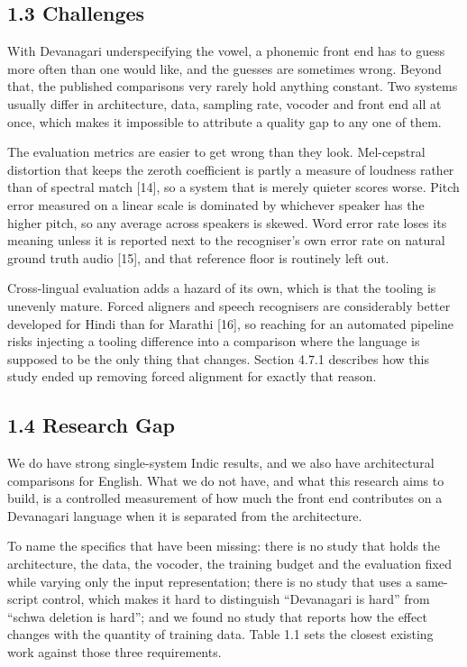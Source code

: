 \documentclass[12pt,a4paper]{article}
\begin{document}
\subsection*{1.3  Challenges}
With Devanagari underspecifying the vowel, a phonemic front end has to guess more often than one would like, and the guesses are sometimes wrong. Beyond that, the published comparisons very rarely hold anything constant. Two systems usually differ in architecture, data, sampling rate, vocoder and front end all at once, which makes it impossible to attribute a quality gap to any one of them.

The evaluation metrics are easier to get wrong than they look. Mel-cepstral distortion that keeps the zeroth coefficient is partly a measure of loudness rather than of spectral match [14], so a system that is merely quieter scores worse. Pitch error measured on a linear scale is dominated by whichever speaker has the higher pitch, so any average across speakers is skewed. Word error rate loses its meaning unless it is reported next to the recogniser's own error rate on natural ground truth audio [15], and that reference floor is routinely left out.

Cross-lingual evaluation adds a hazard of its own, which is that the tooling is unevenly mature. Forced aligners and speech recognisers are considerably better developed for Hindi than for Marathi [16], so reaching for an automated pipeline risks injecting a tooling difference into a comparison where the language is supposed to be the only thing that changes. Section 4.7.1 describes how this study ended up removing forced alignment for exactly that reason.

\subsection*{1.4  Research Gap}
We do have strong single-system Indic results, and we also have architectural comparisons for English. What we do not have, and what this research aims to build, is a controlled measurement of how much the front end contributes on a Devanagari language when it is separated from the architecture.

To name the specifics that have been missing: there is no study that holds the architecture, the data, the vocoder, the training budget and the evaluation fixed while varying only the input representation; there is no study that uses a same-script control, which makes it hard to distinguish “Devanagari is hard” from “schwa deletion is hard”; and we found no study that reports how the effect changes with the quantity of training data. Table 1.1 sets the closest existing work against those three requirements.
\end{document}
